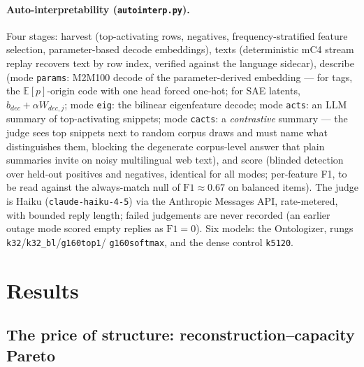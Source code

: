 \documentclass[11pt]{article}
\begin{document}
\paragraph{Auto-interpretability (\texttt{autointerp.py}).}
Four stages: harvest (top-activating rows, negatives, frequency-stratified
feature selection, parameter-based decode embeddings), texts
(deterministic mC4 stream replay recovers text by row index, verified
against the language sidecar), describe (mode \texttt{params}: M2M100
decode of the parameter-derived embedding --- for tags, the
$\mathbb{E}[p]$-origin code with one head forced one-hot; for SAE latents,
$b_{dec} + \alpha W_{dec,j}$; mode \texttt{eig}: the bilinear
eigenfeature decode; mode \texttt{acts}: an LLM summary of top-activating
snippets; mode \texttt{cacts}: a \emph{contrastive} summary --- the judge
sees top snippets next to random corpus draws and must name what
distinguishes them, blocking the degenerate corpus-level answer that
plain summaries invite on noisy multilingual web text), and score
(blinded detection over held-out positives and negatives, identical for
all modes; per-feature F1, to be read against the always-match null of
$\mathrm{F1} \approx 0.67$ on balanced items). The judge is Haiku
(\texttt{claude-haiku-4-5}) via the Anthropic Messages API, rate-metered,
with bounded reply length; failed judgements are never recorded (an
earlier outage mode scored empty replies as $\mathrm{F1}=0$). Six models:
the Ontologizer,
rungs \texttt{k32}/\texttt{k32\_bl}/\texttt{g160top1}/%
\texttt{g160softmax}, and the dense control \texttt{k5120}.

\section{Results}

\subsection{The price of structure: reconstruction--capacity Pareto}
\end{document}
